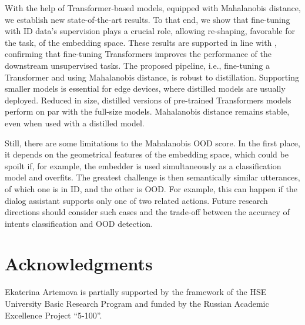\documentclass[letterpaper, final]{article} %
\begin{document}
With the help of Transformer-based models, equipped with Mahalanobis distance, we establish new state-of-the-art results. To that end, we show that fine-tuning with ID data's supervision plays a crucial role, allowing re-shaping, favorable for the task, of the embedding space. These results are supported in line with \cite{reimers2019sentence}, confirming that fine-tuning Transformers improves the performance of the downstream unsupervised tasks. The proposed pipeline, i.e., fine-tuning a Transformer and using Mahalanobis distance, is robust to distillation. Supporting smaller models is essential for edge devices, where distilled models are usually deployed. Reduced in size, distilled versions of pre-trained Transformers models perform on par with the full-size models. Mahalanobis distance remains stable, even when used with a distilled model.

Still, there are some limitations to the Mahalanobis OOD score. In the first place, it depends on the geometrical features of the embedding space, which could be spoilt if, for example, the embedder is used simultaneously as a classification model and overfits. The greatest challenge is then semantically similar utterances, of which one is in ID, and the other is OOD. For example, this can happen if the dialog assistant supports only one of two related actions. Future research directions should consider such cases and the trade-off between the accuracy of intents classification and OOD detection. 


\section*{Acknowledgments}
Ekaterina Artemova is partially supported by the framework of the HSE University Basic Research Program and funded by the Russian Academic Excellence Project  ``5-100''.



%
\end{document}
